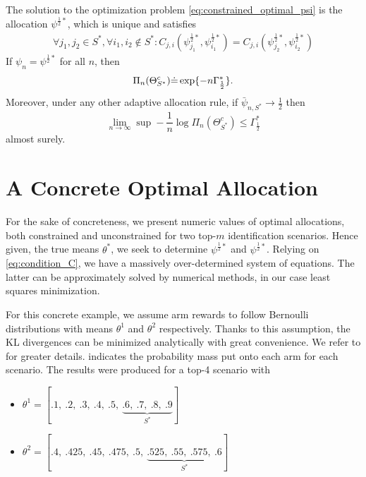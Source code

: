 \begin{proposition}\label{proposition:characterization}
  The solution to the optimization problem \ref{eq:constrained_optimal_psi} is the allocation $\psi^{\frac{1}{2}*}$, which is unique and satisfies
  \begin{align}
    \forall j_1, j_2 \in S^*, \forall i_1, i_2 \notin S^*: C_{j, i}(\psi^{\frac{1}{2}*}_{j_1}, \psi^{\frac{1}{2}*}_{i_1}) = C_{j, i}(\psi^{\frac{1}{2}*}_{j_2}, \psi^{\frac{1}{2}*}_{i_2})\label{eq:condition_C}
  \end{align}
  If $\psi_n = \psi^{\frac{1}{2}*}$ for all $n$, then
  \[\Pi_n(\Theta_{S^*}^c) \dot{=} \exp \{-n\Gamma^*_{\frac{1}{2}}\}.\]
  Moreover, under any other adaptive allocation rule, if $\bar{\psi}_{n, S^*} \rightarrow \frac{1}{2}$ then
  \[\lim_{n \rightarrow \infty} \sup - \frac{1}{n} \log \Pi_n(\Theta^c_{S^*}) \leq \Gamma^*_{\frac{1}{2}}\]
  almost surely.
\end{proposition}

\section{A Concrete Optimal Allocation}\label{section:concrete_optimal_allocation}
For the sake of concreteness, we present numeric values of optimal allocations, both constrained and unconstrained for two top-$m$ identification scenarios.
Hence given, the true means $\theta^*$, we seek to determine $\psi^{\frac{1}{2}*}$ and $\psi^{\frac{1}{2}*}$. Relying on \eqref{eq:condition_C}, we have a massively over-determined system of equations. The latter can be approximately solved by numerical methods, in our case least squares minimization.

For this concrete example, we assume arm rewards to follow Bernoulli distributions with means $\theta^1$ and $\theta^2$ respectively. Thanks to this assumption, the KL divergences can be minimized analytically with great convenience. We refer to  for greater details.  indicates the probability mass put onto each arm for each scenario. The results were produced for a top-4 scenario with
\begin{itemize}
  \item $\theta^1 = [.1,\ .2,\ .3,\ .4,\ .5,\ \underbrace{.6,\ .7,\ .8,\ .9}_\text{$S^*$}]$
  \item $\theta^2 = [.4,\ .425,\ .45,\ .475,\ .5,\ \underbrace{.525,\ .55,\ .575,\ .6}_\text{$S^*$}]$
\end{itemize}

